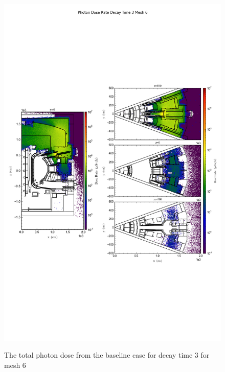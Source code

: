 \begin{figure}[ht!]
\centering
\includegraphics[trim={0cm 9cm 0cm 10cm},clip,scale=0.75]{../plots/final_model/Photon_Dose_Rate_Decay_Time_3_Mesh_6.png}
\label{fig:photons_dc3_no4bc_m6_flux}
\caption{The total photon dose from the baseline case for decay time 3 for mesh 6}
\end{figure}
